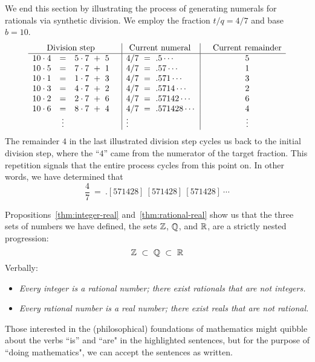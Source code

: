 \medskip

We end this section by illustrating the process of generating numerals for rationals via synthetic division.  We employ the fraction $t/q = 4/7$ and base $b = 10$.
\[
\begin{array}{lclc|l|cc}
\multicolumn{3}{c}{\mbox{Division step}} & &  \hspace*{.05in} \mbox{Current numeral} & &
\mbox{Current remainder} \\
\hline
10 \cdot 4   & = & 5 \cdot 7 \ + \ 5 &
      & 4/7 \ = \ .5 \cdots &
      & 5 \\
10 \cdot 5 & = & 7 \cdot 7 \ + \ 1 &
      & 4/7 \ = \ .57 \cdots &
      & 1 \\
10 \cdot 1 & = & 1 \cdot 7 \ + \ 3 &
      & 4/7 \ = \ .571 \cdots &
      & 3 \\
10 \cdot 3 & = & 4 \cdot 7 \ + \ 2 &
      & 4/7 \ = \ .5714 \cdots &
      & 2 \\
10 \cdot 2 & = & 2 \cdot 7 \ + \ 6 &
      & 4/7 \ = \ .57142 \cdots &
      & 6 \\
10 \cdot 6 & = & 8 \cdot 7 \ + \ 4 &
      & 4/7 \ = \ .571428 \cdots &
      & 4 \\
 & \vdots & & & \vdots & & \vdots
\end{array}
\]
The remainder $4$ in the last illustrated division step cycles us back to the initial division step, where the ``$4$'' came from the numerator of the target fraction.  This repetition signals that the
entire process cycles from this point on.  In other words, we have determined that
\[ \frac{4}{7} \ = \ .[571428] \ [571428] \ [571428] \ \cdots \]

\bigskip

Propositions~\ref{thm:integer-real} and~\ref{thm:rational-real} show us that the three sets of numbers we have defined, the sets $\mathbb{Z}$, $\mathbb{Q}$, and $\mathbb{R}$, are a strictly nested progression:
\[ \Z \ \subset \ \Q \ \subset \ \R \]
Verbally:
\begin{itemize}
\item
{\em Every integer is a rational number; there exist rationals that are not integers.}
\item
{\em Every rational number is a real number; there exist reals that are not rational.} 
\end{itemize}

Those interested in the (philosophical) foundations of mathematics might quibble about the verbs ``is'' and ``are" in the highlighted sentences, but for the purpose of ``doing mathematics", we can accept the sentences as written.

